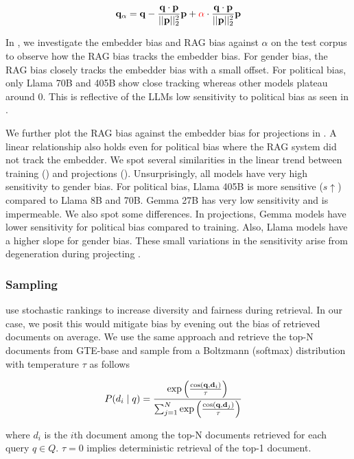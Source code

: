 \begin{align}
    \mathbf{q}_\alpha = \mathbf{q} - \frac{\mathbf{q}\cdot\mathbf{p}}{||\mathbf{p}||^2_2}\mathbf{p} + \textcolor{red}{\alpha} \cdot \frac{\mathbf{q}\cdot\mathbf{p}}{||\mathbf{p}||^2_2}\mathbf{p}
\end{align}

In , we investigate the embedder bias and RAG bias against $\alpha$ on the test corpus to observe how the RAG bias tracks the embedder bias. For gender bias, the RAG bias closely tracks the embedder bias with a small offset. For political bias, only Llama 70B and 405B show close tracking whereas other models plateau around 0. This is reflective of the LLMs low sensitivity to political bias as seen in . 

We further plot the RAG bias against the embedder bias for projections in . A linear relationship also holds even for political bias where the RAG system did not track the embedder. We spot several similarities in the linear trend between training () and projections (). Unsurprisingly, all models have very high sensitivity to gender bias. For political bias, Llama 405B is more sensitive ($s\uparrow$) compared to Llama 8B and 70B. Gemma 27B has very low sensitivity and is impermeable. We also spot some differences. In projections, Gemma models have lower sensitivity for political bias compared to training. Also, Llama models have a higher slope for gender bias. These small variations in the sensitivity arise from degeneration during projecting .

\subsubsection{Sampling} 
\cite{kim2024towards,zamani2024stochasticragendtoendretrievalaugmented} use stochastic rankings to increase diversity and fairness during retrieval. In our case, we posit this would mitigate bias by evening out the bias of retrieved documents on average. We use the same approach and retrieve the top-N documents from GTE-base and sample from a Boltzmann (softmax) distribution with temperature $\tau$ as follows

\begin{align}
P(d_i \mid q) &= \frac{\exp\left(\frac{\text{cos}(\mathbf{q}, \mathbf{d}_i)}{\tau}\right)}{\sum_{j=1}^{N} \exp\left(\frac{\text{cos}(\mathbf{q}, \mathbf{d}_j)}{\tau}\right)}
\end{align}

where $d_i$ is the $i$th document among the top-N documents retrieved for each query $q \in Q$. $\tau=0$ implies deterministic retrieval of the top-1 document.

